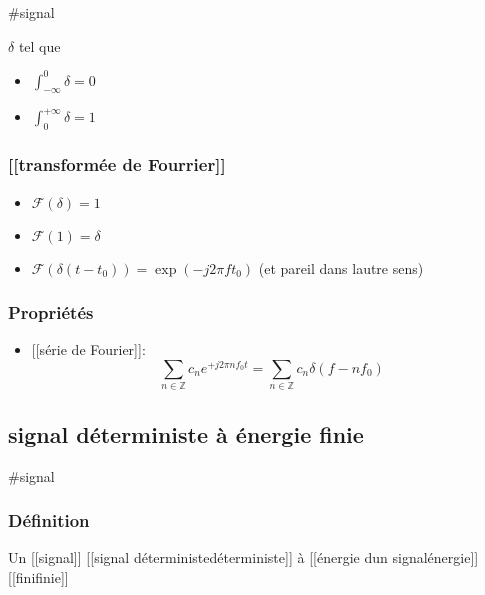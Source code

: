\documentclass[
]{article}
\providecommand{\tightlist}{%
  \setlength{\itemsep}{0pt}\setlength{\parskip}{0pt}}
\begin{document}
\#signal

\(\delta\) tel que

\begin{itemize}
\tightlist
\item
  \(\int_{-\infty}^0 \delta = 0\)
\item
  \(\int_{0}^{+\infty} \delta = 1\)
\end{itemize}

\hypertarget{transformuxe9e-de-fourrier-1}{%
\subsubsection{{[}{[}transformée de
Fourrier{]}{]}}\label{transformuxe9e-de-fourrier-1}}

\begin{itemize}
\tightlist
\item
  \(\mathcal{F}(\delta) = 1\)
\item
  \(\mathcal{F}(1) = \delta\)
\item
  \(\mathcal{F}(\delta(t-t_0)) = \operatorname{exp}(-j2 \pi ft_0)\) (et
  pareil dans l\textquotesingle autre sens)
\end{itemize}

\hypertarget{propriuxe9tuxe9s-3}{%
\subsubsection{Propriétés}\label{propriuxe9tuxe9s-3}}

\begin{itemize}
\tightlist
\item
  {[}{[}série de Fourier{]}{]}: \[
  \sum_{n\in \mathbb{Z}} c_n e^{+j2\pi n f_0 t} = \sum_{n\in \mathbb{Z}} c_n \delta(f-nf_0)
  \]
\end{itemize}

\hypertarget{signal-duxe9terministe-uxe0-uxe9nergie-finie}{%
\subsection{signal déterministe à énergie
finie}\label{signal-duxe9terministe-uxe0-uxe9nergie-finie}}

\#signal

\hypertarget{duxe9finition}{%
\subsubsection{Définition}\label{duxe9finition}}

Un {[}{[}signal{]}{]} {[}{[}signal
déterministe\textbar déterministe{]}{]} à {[}{[}énergie
d\textquotesingle un signal\textbar énergie{]}{]}
{[}{[}fini\textbar finie{]}{]}
\end{document}

